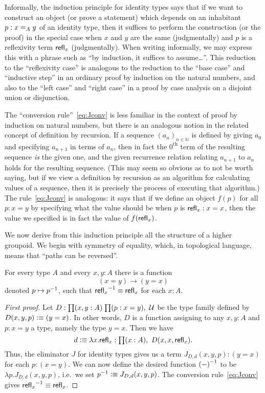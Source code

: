 Informally, the induction principle for identity types says that if we want to construct an object (or prove a statement) which depends on an inhabitant $p:\id[A]xy$ of an identity type, then it suffices to perform the construction (or the proof) in the special case when $x$ and $y$ are the same (judgmentally) and $p$ is a reflexivity term $\refl{x}$ (judgmentally).
When writing informally, we may express this with a phrase such as ``by induction, it suffices to assume\dots''.
This reduction to the ``reflexivity case'' is analogous to the reduction to the ``base case'' and ``inductive step'' in an ordinary proof by induction on the natural numbers, and also to the ``left case'' and ``right case'' in a proof by case analysis on a disjoint union or disjunction.

The ``conversion rule''~\eqref{eq:Jconv} is less familiar in the context of proof by induction on natural numbers, but there is an analogous notion in the related concept of definition by recursion.
If a sequence $(a_n)_{n\in \mathbb{N}}$ is defined by giving $a_0$ and specifying $a_{n+1}$ in terms of $a_n$, then in fact the $0^{\mathrm{th}}$ term of the resulting sequence \emph{is} the given one, and the given recurrence relation relating $a_{n+1}$ to $a_n$ holds for the resulting sequence.
(This may seem so obvious as to not be worth saying, but if we view a definition by recursion as an algorithm for calculating values of a sequence, then it is precisely the process of executing that algorithm.)
The rule~\eqref{eq:Jconv} is analogous: it says that if we define an object $f(p)$ for all $p:x=y$ by specifying what the value should be when $p$ is $\refl{x}:x=x$, then the value we specified is in fact the value of $f(\refl{x})$.

We now derive from this induction principle all the structure of a higher groupoid.
We begin with symmetry of equality, which, in topological language, means that ``paths can be reversed''.

\begin{lem}\label{lem:opp}
  For every type $A$ and every $x,y:A$ there is a function
  \begin{equation*}
    (x= y)\to(y= x)
  \end{equation*}
  denoted $p\mapsto \opp{p}$, such that $\opp{\refl{x}}\jdeq\refl{x}$ for each $x:A$.
\end{lem}
\begin{proof}[First proof]
  Let $D:\prd{x,y:A}{p:x= y} \type$ be the type family defined by $D(x,y,p)\defeq (y= x)$.
  In other words, $D$ is a function assigning to any $x,y:A$ and $p:x=y$ a type, namely the type $y=x$.
  Then we have
  \begin{equation*}
    d\defeq \lambda x.\refl{x}:\prd{x:A} D(x,x,\refl{x}).
  \end{equation*}
  Thus, the eliminator $J$ for identity types gives us a term $J_{D,d}(x,y,p): (y= x)$ for each $p:(x= y)$.
  We can now define the desired function $\opp{(-)}$ to be $\lambda p. J_{D,d}(x,y,p)$, i.e.\ we set $\opp{p} \defeq J_{D,d}(x,y,p)$.
  The conversion rule~\eqref{eq:Jconv} gives $\opp{\refl{x}}\jdeq \refl{x}$.
\end{proof}

